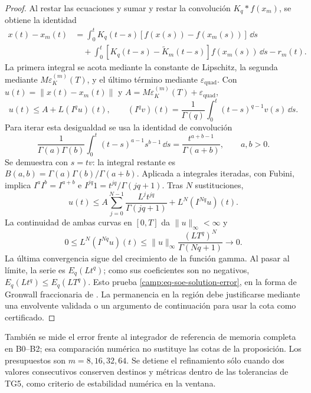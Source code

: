 \begin{proof}
Al restar las ecuaciones y sumar y restar la convolución
\(K_q*f(x_m)\), se obtiene la identidad
\begin{align*}
 x(t)-x_m(t)
 &=\int_0^tK_q(t-s)[f(x(s))-f(x_m(s))]\,\dd s\\
 &\quad+\int_0^t[K_q(t-s)-\widetilde K_m(t-s)]f(x_m(s))\,\dd s-r_m(t).
\end{align*}
La primera integral se acota mediante la constante de Lipschitz, la segunda
mediante \(M\varepsilon_K^{(m)}(T)\), y el último término mediante
\(\varepsilon_{\mathrm{quad}}\). Con
\(u(t)=\|x(t)-x_m(t)\|\) y
\(A=M\varepsilon_K^{(m)}(T)+\varepsilon_{\mathrm{quad}}\),
\[
 u(t)\leq A+L(I^qu)(t),\qquad
 (I^qv)(t)=\frac1{\Gamma(q)}\int_0^t(t-s)^{q-1}v(s)\,\dd s.
\]
Para iterar esta desigualdad se usa la identidad de convolución
\begin{equation}
 \frac1{\Gamma(a)\Gamma(b)}
 \int_0^t(t-s)^{a-1}s^{b-1}\,\dd s
 =\frac{t^{a+b-1}}{\Gamma(a+b)},\qquad a,b>0.
 \label{camp:eq-fractional-convolution}
\end{equation}
Se demuestra con \(s=tv\): la integral restante es
\(B(a,b)=\Gamma(a)\Gamma(b)/\Gamma(a+b)\). Aplicada a integrales iteradas,
con Fubini, implica \(I^aI^b=I^{a+b}\) e
\(I^{jq}1=t^{jq}/\Gamma(jq+1)\). Tras \(N\) sustituciones,
\[
 u(t)\leq A\sum_{j=0}^{N-1}\frac{L^jt^{jq}}{\Gamma(jq+1)}
             +L^N(I^{Nq}u)(t).
\]
La continuidad de ambas curvas en \([0,T]\) da \(\|u\|_\infty<\infty\) y
\[
 0\leq L^N(I^{Nq}u)(t)
 \leq\|u\|_\infty\frac{(LT^q)^N}{\Gamma(Nq+1)}\longrightarrow0.
\]
La última convergencia sigue del crecimiento de la función gamma. Al pasar
al límite, la serie es \(E_q(Lt^q)\); como sus coeficientes son no negativos,
\(E_q(Lt^q)\leq E_q(LT^q)\). Esto prueba
\cref{camp:eq-soe-solution-error}, en la forma de Gronwall fraccionaria de
\cite{Gomoyunov2018Convex}. La permanencia en la región debe justificarse
mediante una envolvente validada o un argumento de continuación para usar la
cota como certificado.
\end{proof}

También se mide el error frente al integrador de referencia de memoria
completa en B0--B2; esa comparación numérica no sustituye las cotas de la
proposición. Los
presupuestos son \(m=8,16,32,64\). Se detiene el refinamiento sólo cuando
dos valores consecutivos conserven destinos y métricas dentro de las
tolerancias de TG5, como criterio de estabilidad numérica en la ventana.

